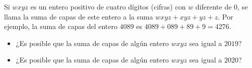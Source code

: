 Si $wxyz$ es un entero positivo de cuatro dígitos (cifras) con $w$ diferente de $0$, se llama la suma de capas de este entero a la suma $wxyz+xyz+yz+z$. Por ejemplo, la suma de capas del entero $4089$ es $4089+089+89+9=4276$. 
 \begin{itemize} 
 \item ¿Es posible que la suma de capas de algún entero $wxyz$ sea igual a $2019$?
 \item ¿Es posible que la suma de capas de algún entero $wxyz$ sea igual a $2020$?
 \end{itemize} 